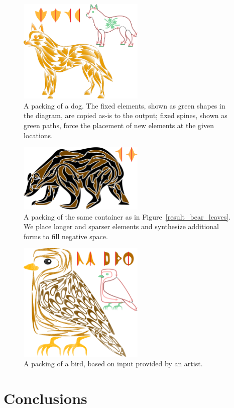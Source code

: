 \begin{figure} %
\centering
\includegraphics[width=6cm]{figures/flowpak/dog_flower.pdf}
\caption[A packing of a dog]
{A packing of a dog. The fixed elements, shown as green
	shapes in the diagram, are copied as-is to the output; fixed spines,
	shown as green paths, force the placement of new elements at the given
	locations.}
\label{result_dog}
\end{figure}




\begin{figure} %
\centering
\includegraphics[width=6cm]{figures/flowpak/bear_offset_space.pdf}
\caption[A packing of a bear with elements created from negative space]
{A packing of the same container as in Figure~\ref{result_bear_leaves}.
	We place longer and sparser elements and synthesize additional forms to
	fill negative space.}
\label{result_bear_offset}
\end{figure}

\begin{figure} %
\centering
\includegraphics[width=6cm]{figures/flowpak/bird_square.pdf}
\caption[A packing of a bird]
{A packing of a bird, based on input provided by
	an artist.}
\label{bird_square}
\end{figure}

\section{Conclusions}

